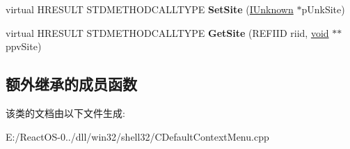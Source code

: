 \begin{DoxyCompactItemize}
\item 
\mbox{\label{class_c_default_context_menu_ad145c0b1180ded3c5ccf60c4f97f94e1}} 
virtual H\+R\+E\+S\+U\+LT S\+T\+D\+M\+E\+T\+H\+O\+D\+C\+A\+L\+L\+T\+Y\+PE {\bfseries Set\+Site} (\hyperlink{interface_i_unknown}{I\+Unknown} $\ast$p\+Unk\+Site)
\item 
\mbox{\label{class_c_default_context_menu_a059d0a1fa0775cafca5026a673df4588}} 
virtual H\+R\+E\+S\+U\+LT S\+T\+D\+M\+E\+T\+H\+O\+D\+C\+A\+L\+L\+T\+Y\+PE {\bfseries Get\+Site} (R\+E\+F\+I\+ID riid, \hyperlink{interfacevoid}{void} $\ast$$\ast$ppv\+Site)
\end{DoxyCompactItemize}
\subsection*{额外继承的成员函数}


该类的文档由以下文件生成\+:\begin{DoxyCompactItemize}
\item 
E\+:/\+React\+O\+S-\/0../dll/win32/shell32/C\+Default\+Context\+Menu.\+cpp\end{DoxyCompactItemize}
